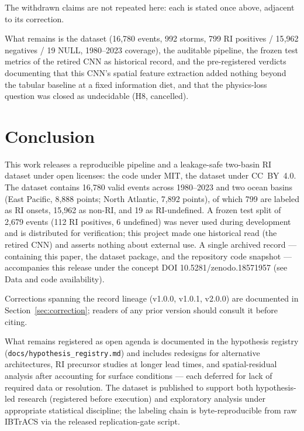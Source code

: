 \documentclass[11pt]{article}
\begin{document}
The withdrawn claims are not repeated here: each is stated once above,
adjacent to its correction.

What remains is the dataset (16{,}780 events, 992 storms, 799 RI positives /
15{,}962 negatives / 19 NULL, 1980--2023 coverage), the auditable pipeline, the
frozen test metrics of the retired CNN as historical record, and the
pre-registered verdicts documenting that this CNN's spatial feature extraction
added nothing beyond the tabular baseline at a fixed information diet, and that
the physics-loss question was closed as undecidable (H8, cancelled).

\section{Conclusion}

This work releases a reproducible pipeline and a leakage-safe two-basin RI
dataset under open licenses: the code under MIT, the dataset under CC~BY~4.0.
The dataset contains 16{,}780 valid events across 1980--2023 and two ocean
basins (East Pacific, 8{,}888 points; North Atlantic, 7{,}892 points), of which
799 are labeled as RI onsets, 15{,}962 as non-RI, and 19 as RI-undefined. A
frozen test split of 2{,}679 events (112 RI positives, 6 undefined) was never
used during development and is distributed for verification; this project made
one historical read (the retired CNN) and asserts nothing about external use.
A single archived record --- containing this paper, the dataset package, and
the repository code snapshot --- accompanies this release under the concept
DOI 10.5281/zenodo.18571957 (see Data and code availability).

Corrections spanning the record lineage (v1.0.0, v1.0.1, v2.0.0) are documented
in Section~\ref{sec:correction}; readers of any prior version should consult it
before citing.

What remains registered as open agenda is documented in the hypothesis registry
(\texttt{docs/hypothesis\_registry.md}) and includes redesigns for alternative
architectures, RI precursor studies at longer lead times, and spatial-residual
analysis after accounting for surface conditions --- each deferred for lack of
required data or resolution. The dataset is published to support both
hypothesis-led research (registered before execution) and exploratory analysis
under appropriate statistical discipline; the labeling chain is
byte-reproducible from raw IBTrACS via the released replication-gate script.
\end{document}
